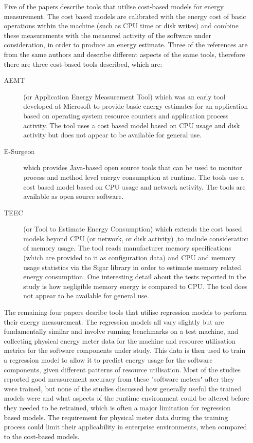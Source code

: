 Five of the papers describe tools that utilise cost-based models for energy measurement.  The cost based models are calibrated with the energy cost of basic operations within the machine (such as CPU time or disk writes) and combine these measurements with the measured activity of the software under consideration, in order to produce an energy estimate.  Three of the references are from the same authors and describe different aspects of the same tools, therefore there are three cost-based tools described, which are:
\begin{description}
	\item[AEMT] (or Application Energy Measurement Tool) which was an early tool developed at Microsoft to provide basic energy estimates for an application based on operating system resource counters and application process activity.  The tool uses a cost based model based on CPU usage and disk activity but does not appear to be available for general use.  \cite{kansal2008-energyprofiling}
	\item[E-Surgeon] which provides Java-based open source tools that can be used to monitor process and method level energy consumption at runtime.  The tools use a cost based model based on CPU usage and network activity. The tools are available as open source software. \cite{noureddine2012-hotspots, noureddine2014-energyutest, noureddine2015-hotspots, noureddine2016-jolinar}
	\item[TEEC] (or Tool to Estimate Energy Consumption) which extends the cost based models beyond CPU (or network, or disk activity) ,to include consideration of memory usage. The tool reads manufacturer memory specifications (which are provided to it as configuration data) and CPU and memory usage statistics via the Sigar library in order to estimate memory related energy consumption. One interesting detail about the tests reported in the study is how negligible memory energy is compared to CPU.  The tool does not appear to be available for general use. \cite{acar2016-beyondcpu}
\end{description}

The remaining four papers desribe tools that utilise regression models to perform their energy measurement.  The regression models all vary slightly but are fundamentally similar and involve running benchmarks on a test machine, and collecting physical energy meter data for the machine and resource utilisation metrics for the software components under study.  This data is then used to train a regression model to allow it to predict energy usage for the software components, given different patterns of resource utilisation.  Most of the studies reported good measurement accuracy from these "software meters" after they were trained, but none of the studies discussed how generally useful the trained models were and what aspects of the runtime environment could be altered before they needed to be retrained, which is often a major limitation for regression based models.  The requirement for physical meter data during the training process could limit their applicability in enterprise environments, when compared to the cost-based models.

